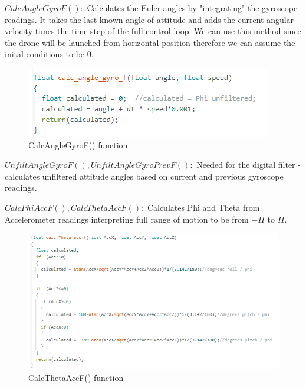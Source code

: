 $CalcAngleGyroF():$\newline
Calculates the Euler angles by "integrating" the gyroscope readings. It takes the last known angle of attitude and adds the current angular velocity times the time step of the full control loop. We can use this method since the drone will be launched from horizontal position therefore we can assume the inital conditions to be 0.


\begin{figure}[H]
    \begin{center}
    \includegraphics[scale = 0.85]{pictures/IMU/calc_angle_gyro.png}
    \end{center}
    \caption{CalcAngleGyroF() function}
    \label{fig:my_label}
\end{figure}


$UnfiltAngleGyroF(), UnfiltAngleGyroPrevF():$\newline
Needed for the digital filter - calculates unfiltered attitude angles based on current and previous gyroscope readings.

$CalcPhiAccF(), CalcThetaAccF():$\newline
Calculates Phi and Theta from Accelerometer readings interpreting full range of motion to be from $-\Pi$ to $\Pi$.

\begin{figure}[H]
    \begin{center}
    \includegraphics[scale = 0.85]{pictures/IMU/calc_angle_theta.png}
    \end{center}
    \caption{CalcThetaAccF() function}
    \label{fig:my_label}
\end{figure}



